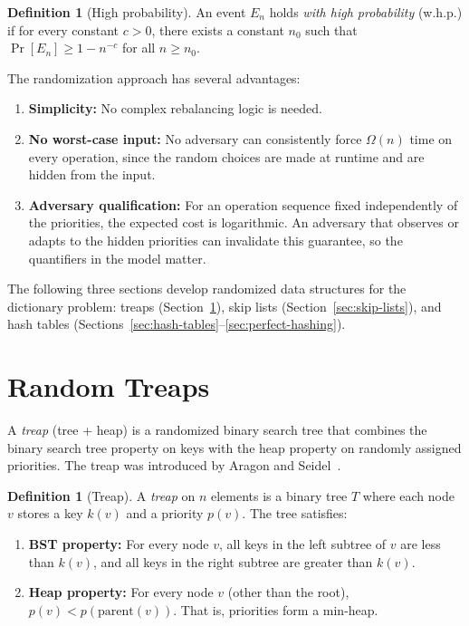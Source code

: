 \documentclass[twoside,12pt]{book}
\theoremstyle{plain}
\theoremstyle{definition}
\newtheorem{definition}[theorem]{Definition}
\theoremstyle{remark}
\begin{document}
\begin{definition}[High probability]
An event $E_n$ holds \emph{with high probability} (w.h.p.) if for every constant $c > 0$, there exists a constant $n_0$ such that $\Pr[E_n] \geq 1 - n^{-c}$ for all $n \geq n_0$.
\end{definition}

The randomization approach has several advantages:
\begin{enumerate}[nosep]
    \item \textbf{Simplicity:} No complex rebalancing logic is needed.
    \item \textbf{No worst-case input:} No adversary can consistently force $\Omega(n)$ time on every operation, since the random choices are made at runtime and are hidden from the input.
    \item \textbf{Adversary qualification:} For an operation sequence fixed independently of the priorities, the expected cost is logarithmic. An adversary that observes or adapts to the hidden priorities can invalidate this guarantee, so the quantifiers in the model matter.
\end{enumerate}

The following three sections develop randomized data structures for the dictionary problem: treaps (Section~\ref{sec:treaps}), skip lists (Section~\ref{sec:skip-lists}), and hash tables (Sections~\ref{sec:hash-tables}--\ref{sec:perfect-hashing}).

\section{Random Treaps}
\label{sec:treaps}

A \emph{treap} (tree + heap) is a randomized binary search tree that combines the binary search tree property on keys with the heap property on randomly assigned priorities. The treap was introduced by Aragon and Seidel~\cite{aron1989}.

\begin{definition}[Treap]
A \emph{treap} on $n$ elements is a binary tree $T$ where each node $v$ stores a key $k(v)$ and a priority $p(v)$. The tree satisfies:
\begin{enumerate}[nosep]
    \item \textbf{BST property:} For every node $v$, all keys in the left subtree of $v$ are less than $k(v)$, and all keys in the right subtree are greater than $k(v)$.
    \item \textbf{Heap property:} For every node $v$ (other than the root), $p(v) < p(\text{parent}(v))$. That is, priorities form a min-heap.
\end{enumerate}
\end{definition}
\end{document}
